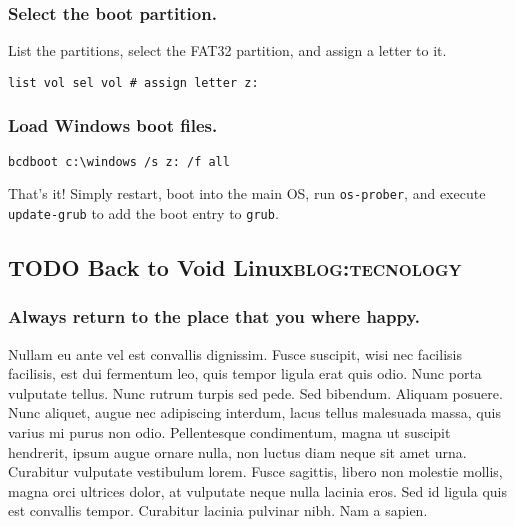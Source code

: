 \documentclass[11pt]{article}
\begin{document}
\subsubsection{Select the boot partition.}
\label{sec:org50a9f58}
List the partitions, select the FAT32 partition, and assign a letter to it. 
\begin{verbatim}
list vol sel vol # assign letter z: 
\end{verbatim}
\subsubsection{Load Windows boot files.}
\label{sec:orgf53b44a}
\begin{verbatim}
bcdboot c:\windows /s z: /f all 
\end{verbatim}

That's it! Simply restart, boot into the main OS, run \texttt{os-prober}, and execute \texttt{update-grub} to add the boot entry to \texttt{grub}.
\subsection{{\bfseries\sffamily TODO} Back to Void Linux\hfill{}\textsc{blog:tecnology}}
\label{sec:orgb151400}
\subsubsection{Always return to the place that you where happy.}
\label{sec:orgf5a7dd1}
Nullam eu ante vel est convallis dignissim.  Fusce suscipit, wisi nec facilisis facilisis, est dui fermentum leo, quis tempor ligula erat quis odio.  Nunc porta vulputate tellus.  Nunc rutrum turpis sed pede.  Sed bibendum.  Aliquam posuere.  Nunc aliquet, augue nec adipiscing interdum, lacus tellus malesuada massa, quis varius mi purus non odio.  Pellentesque condimentum, magna ut suscipit hendrerit, ipsum augue ornare nulla, non luctus diam neque sit amet urna.  Curabitur vulputate vestibulum lorem.  Fusce sagittis, libero non molestie mollis, magna orci ultrices dolor, at vulputate neque nulla lacinia eros.  Sed id ligula quis est convallis tempor.  Curabitur lacinia pulvinar nibh.  Nam a sapien.
\end{document}
